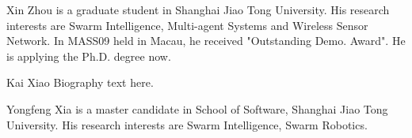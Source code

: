 \documentclass[journal]{IEEEtran}
\begin{document}
\begin{IEEEbiography}{Xin Zhou}
is a graduate student in Shanghai Jiao Tong University. His research interests are Swarm Intelligence, Multi-agent Systems and Wireless Sensor Network. In MASS09 held in Macau, he received "Outstanding Demo. Award". He is applying the Ph.D. degree now.
\end{IEEEbiography}

\begin{IEEEbiographynophoto}{Kai Xiao}
Biography text here.
\end{IEEEbiographynophoto}


\begin{IEEEbiographynophoto}{Yongfeng Xia}
is a master candidate in School of Software, Shanghai Jiao Tong University. His research interests are Swarm Intelligence, Swarm Robotics.
\end{IEEEbiographynophoto}




\end{document}
